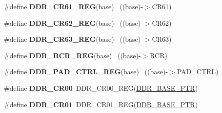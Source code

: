 \begin{DoxyCompactItemize}
\item 
\hypertarget{group___d_d_r___register___accessor___macros_ga22274dcbbea4d3d70d2cb93e790f189b}{}\#define {\bfseries D\+D\+R\+\_\+\+C\+R61\+\_\+\+R\+E\+G}(base)                                          ~((base)-\/$>$C\+R61)\label{group___d_d_r___register___accessor___macros_ga22274dcbbea4d3d70d2cb93e790f189b}

\item 
\hypertarget{group___d_d_r___register___accessor___macros_ga7c1ddb06d1ca91fab00862bb333f550a}{}\#define {\bfseries D\+D\+R\+\_\+\+C\+R62\+\_\+\+R\+E\+G}(base)                                          ~((base)-\/$>$C\+R62)\label{group___d_d_r___register___accessor___macros_ga7c1ddb06d1ca91fab00862bb333f550a}

\item 
\hypertarget{group___d_d_r___register___accessor___macros_ga030b907bca7a841cf5031f3407eedfb9}{}\#define {\bfseries D\+D\+R\+\_\+\+C\+R63\+\_\+\+R\+E\+G}(base)                                          ~((base)-\/$>$C\+R63)\label{group___d_d_r___register___accessor___macros_ga030b907bca7a841cf5031f3407eedfb9}

\item 
\hypertarget{group___d_d_r___register___accessor___macros_gaf7ef0a9adadf63d62437c5dc3cdbd4b3}{}\#define {\bfseries D\+D\+R\+\_\+\+R\+C\+R\+\_\+\+R\+E\+G}(base)                                            ~((base)-\/$>$R\+C\+R)\label{group___d_d_r___register___accessor___macros_gaf7ef0a9adadf63d62437c5dc3cdbd4b3}

\item 
\hypertarget{group___d_d_r___register___accessor___macros_ga2f8de2e95c37ee79550b0910f6d32c49}{}\#define {\bfseries D\+D\+R\+\_\+\+P\+A\+D\+\_\+\+C\+T\+R\+L\+\_\+\+R\+E\+G}(base)                                  ~((base)-\/$>$P\+A\+D\+\_\+\+C\+T\+R\+L)\label{group___d_d_r___register___accessor___macros_ga2f8de2e95c37ee79550b0910f6d32c49}

\item 
\hypertarget{group___d_d_r___register___accessor___macros_ga75e262f42f67ae28e54185cd9488d370}{}\#define {\bfseries D\+D\+R\+\_\+\+C\+R00}~D\+D\+R\+\_\+\+C\+R00\+\_\+\+R\+E\+G(\hyperlink{group___d_d_r___peripheral_ga6be9f9ecee4c870709dbf1d87708b205}{D\+D\+R\+\_\+\+B\+A\+S\+E\+\_\+\+P\+T\+R})\label{group___d_d_r___register___accessor___macros_ga75e262f42f67ae28e54185cd9488d370}

\item 
\hypertarget{group___d_d_r___register___accessor___macros_ga0d469cf5e5336b784356cf75b89e46e1}{}\#define {\bfseries D\+D\+R\+\_\+\+C\+R01}~D\+D\+R\+\_\+\+C\+R01\+\_\+\+R\+E\+G(\hyperlink{group___d_d_r___peripheral_ga6be9f9ecee4c870709dbf1d87708b205}{D\+D\+R\+\_\+\+B\+A\+S\+E\+\_\+\+P\+T\+R})\label{group___d_d_r___register___accessor___macros_ga0d469cf5e5336b784356cf75b89e46e1}


\end{DoxyCompactItemize}
